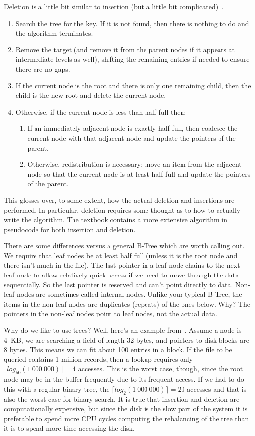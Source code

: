 \documentclass[a4paper]{report}
\begin{document}
Deletion is a little bit similar to insertion (but a little bit complicated)~\cite{dsc}. 

\begin{enumerate}
	\item Search the tree for the key. If it is not found, then there is nothing to do and the algorithm terminates.
	\item Remove the target (and remove it from the parent nodes if it appears at intermediate levels as well), shifting the remaining entries if needed to ensure there are no gaps.
	\item If the current node is the root and there is only one remaining child, then the child is the new root and delete the current node.
	\item Otherwise, if the current node is less than half full then:
		\begin{enumerate}
			\item If an immediately adjacent node is exactly half full, then coalesce the current node with that adjacent node and update the pointers of the parent.
			\item Otherwise, redistribution is necessary: move an item from the adjacent node so that the current node is at least half full and update the pointers of the parent.
		\end{enumerate}
\end{enumerate}

This glosses over, to some extent, how the actual deletion and insertions are performed. In particular, deletion requires some thought as to how to actually write the algorithm. The textbook contains a more extensive algorithm in pseudocode for both insertion and deletion.

There are some differences versus a general B-Tree which are worth calling out. We require that leaf nodes be at least half full (unless it is the root node and there isn't much in the file). The last pointer in a leaf node chains to the next leaf node to allow relatively quick access if we need to move through the data sequentially. So the last pointer is reserved and can't point directly to data. Non-leaf nodes are sometimes called internal nodes. Unlike your typical B-Tree, the items in the non-leaf nodes are duplicates (repeats) of the ones below. Why? The pointers in the non-leaf nodes point to leaf nodes, not the actual data.

Why do we like to use trees? Well, here's an example from~\cite{dsc}. Assume a node is 4~KB, we are searching a field of length 32 bytes, and pointers to disk blocks are 8 bytes. This means we can fit about 100 entries in a block. If the file to be queried contains 1 million records, then a lookup requires only $\lceil log_{50}(1~000~000) \rceil = 4$ accesses. This is the worst case, though, since the root node may be in the buffer frequently due to its frequent access. If we had to do this with a regular binary tree, the $\lceil log_{2}(1~000~000) \rceil = 20$ accesses and that is also the worst case for binary search. It is true that insertion and deletion are computationally expensive, but since the disk is the slow part of the system it is preferable to spend more CPU cycles computing the rebalancing of the tree than it is to spend more time accessing the disk. 
\end{document}
